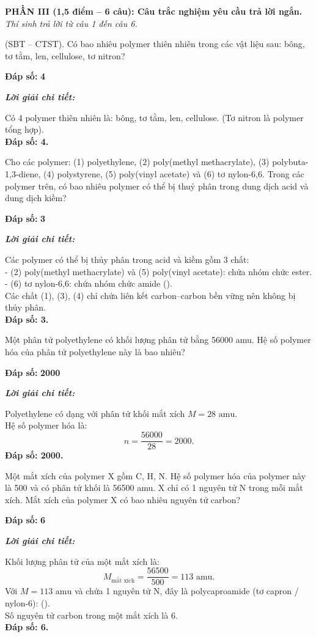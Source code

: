 \documentclass[11pt,a4paper]{article}
\def\loigiai#1{
\par\begingroup\color{blue!80!black}\small
\noindent\textbf{\textit{Lời giải chi tiết:}}\par
#1\par\endgroup}
\begin{document}
\noindent
\textbf{PHẦN III (1,5 điểm -- 6 câu): Câu trắc nghiệm yêu cầu trả lời ngắn.}\\
\textit{Thí sinh trả lời từ câu 1 đến câu 6.}

\setcounter{ex}{0}

\begin{ex}
(SBT -- CTST). Có bao nhiêu polymer thiên nhiên trong các vật liệu sau: bông, tơ tằm, len, cellulose, tơ nitron?
\par\noindent\textbf{Đáp số:} \textbf{\color{red}4}
\loigiai{
Có 4 polymer thiên nhiên là: bông, tơ tằm, len, cellulose. (Tơ nitron là polymer tổng hợp).\\
\textbf{Đáp số: 4.}}
\end{ex}

\begin{ex}
Cho các polymer: (1) polyethylene, (2) poly(methyl methacrylate), (3) polybuta-1,3-diene, (4) polystyrene, (5) poly(vinyl acetate) và (6) tơ nylon-6,6. Trong các polymer trên, có bao nhiêu polymer có thể bị thuỷ phân trong dung dịch acid và dung dịch kiềm?
\par\noindent\textbf{Đáp số:} \textbf{\color{red}3}
\loigiai{
Các polymer có thể bị thủy phân trong acid và kiềm gồm 3 chất:\\
- (2) poly(methyl methacrylate) và (5) poly(vinyl acetate): chứa nhóm chức ester.\\
- (6) tơ nylon-6,6: chứa nhóm chức amide (\ce{-CO-NH-}).\\
Các chất (1), (3), (4) chỉ chứa liên kết carbon--carbon bền vững nên không bị thủy phân.\\
\textbf{Đáp số: 3.}}
\end{ex}

\begin{ex}
Một phân tử polyethylene có khối lượng phân tử bằng 56000 amu. Hệ số polymer hóa của phân tử polyethylene này là bao nhiêu?
\par\noindent\textbf{Đáp số:} \textbf{\color{red}2000}
\loigiai{
Polyethylene có dạng  với phân tử khối mắt xích $M = 28\text{ amu}$.\\
Hệ số polymer hóa là:
$$n = \frac{56000}{28} = 2000.$$
\textbf{Đáp số: 2000.}}
\end{ex}

\begin{ex}
Một mắt xích của polymer X gồm C, H, N. Hệ số polymer hóa của polymer này là 500 và có phân tử khối là 56500 amu. X chỉ có 1 nguyên tử N trong mỗi mắt xích. Mắt xích của polymer X có bao nhiêu nguyên tử carbon?
\par\noindent\textbf{Đáp số:} \textbf{\color{red}6}
\loigiai{
Khối lượng phân tử của một mắt xích là:
$$M_{\text{mắt xích}} = \frac{56500}{500} = 113\text{ amu.}$$
Với $M = 113\text{ amu}$ và chứa 1 nguyên tử N, đây là polycaproamide (tơ capron / nylon-6): \ce{[-NH-(CH2)5-CO-]} (\ce{C6H11NO}).\\
Số nguyên tử carbon trong một mắt xích là 6.\\
\textbf{Đáp số: 6.}}
\end{ex}
\end{document}
